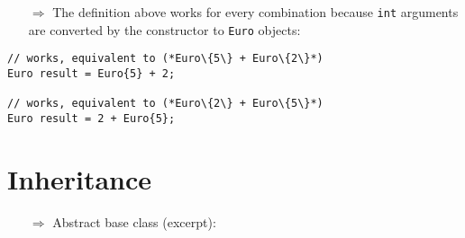 \documentclass[10pt]{article}
\begin{document}
\begin{enumerate}
\item[$\Rightarrow$] The definition above works for every combination because \texttt{int} arguments are converted by the constructor to \texttt{Euro} objects:
\end{enumerate}
\begin{lstlisting}
// works, equivalent to (*Euro\{5\} + Euro\{2\}*)
Euro result = Euro{5} + 2; 

// works, equivalent to (*Euro\{2\} + Euro\{5\}*)
Euro result = 2 + Euro{5}; 
\end{lstlisting}
%
%
\section{Inheritance}
\small
\begin{enumerate}
\item[$\Rightarrow$] Abstract base class (excerpt):
\end{enumerate}
\end{document}
